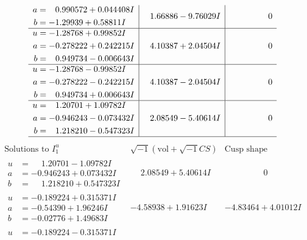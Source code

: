 \documentclass[1p]{elsarticle_modified}
\theoremstyle{definition}
\newcommand{\I}{\sqrt{-1}}
\begin{document}
$$\begin{array}{c|c|c}
\begin{aligned}
a &= \phantom{-}0.990572 + 0.044408 I \\
b &= -1.29939 + 0.58811 I\end{aligned}
 & \phantom{-}1.66886 - 9.76029 I & \phantom{-0.000000 } 0 \\ \hline\begin{aligned}
u &= -1.28768 + 0.99852 I \\
a &= -0.278222 + 0.242215 I \\
b &= \phantom{-}0.949734 - 0.006643 I\end{aligned}
 & \phantom{-}4.10387 + 2.04504 I & \phantom{-0.000000 } 0 \\ \hline\begin{aligned}
u &= -1.28768 - 0.99852 I \\
a &= -0.278222 - 0.242215 I \\
b &= \phantom{-}0.949734 + 0.006643 I\end{aligned}
 & \phantom{-}4.10387 - 2.04504 I & \phantom{-0.000000 } 0 \\ \hline\begin{aligned}
u &= \phantom{-}1.20701 + 1.09782 I \\
a &= -0.946243 - 0.073432 I \\
b &= \phantom{-}1.218210 - 0.547323 I\end{aligned}
 & \phantom{-}2.08549 - 5.40614 I & \phantom{-0.000000 } 0\\
 \hline 
 \end{array}$$\newpage$$\begin{array}{c|c|c}  
\text{Solutions to }I^u_{1}& \I (\text{vol} + \sqrt{-1}CS) & \text{Cusp shape}\\
 \hline 
\begin{aligned}
u &= \phantom{-}1.20701 - 1.09782 I \\
a &= -0.946243 + 0.073432 I \\
b &= \phantom{-}1.218210 + 0.547323 I\end{aligned}
 & \phantom{-}2.08549 + 5.40614 I & \phantom{-0.000000 } 0 \\ \hline\begin{aligned}
u &= -0.189224 + 0.315371 I \\
a &= -0.54390 + 1.96246 I \\
b &= -0.02776 + 1.49683 I\end{aligned}
 & -4.58938 + 1.91623 I & -4.83464 + 4.01012 I \\ \hline\begin{aligned}
u &= -0.189224 - 0.315371 I \\

\end{aligned}
\end{array}$$
\end{document}
